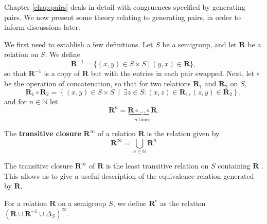 Chapter \ref{chap:pairs} deals in detail with congruences specified by
generating pairs.  We now present some theory relating to generating pairs, in
order to inform discussions later.

We first need to establish a few definitions.  Let $S$ be a semigroup, and let
$\mathbf{R}$ be a relation on $S$.  We define
$$\mathbf{R}^{-1} = \{(x,y) \in S \times S ~|~ (y,x) \in \mathbf{R}\},$$
so that $\mathbf{R}^{-1}$ is a copy of $\mathbf{R}$ but with the entries in each
pair swapped. 
Next, let $\circ$ be the operation of concatenation, so that for two relations
$\mathbf{R}_1$ and $\mathbf{R}_2$ on $S$,
$$\mathbf{R}_1 \circ \mathbf{R}_2 = \left\{(x,y) \in S \times S ~\middle|~
  \exists z \in S: (x,z) \in \mathbf{R}_1, (z,y) \in \mathbf{R}_2\right\},$$
and for $n \in \mathbb{N}$ let
$$\mathbf{R}^n = \underbrace{\mathbf{R} \circ \dots \circ \mathbf{R}}_{n~\text{times}}.$$

\begin{definition}
  \label{def:transitiveclosure}
  The \textbf{transitive closure} $\mathbf{R}^\infty$ of a relation $\mathbf{R}$
  is the relation given by
  $$\mathbf{R}^\infty=\bigcup_{n \in \mathbb{N}}\mathbf{R}^n$$
\end{definition}

The transitive closure $\mathbf{R}^\infty$ of $\mathbf{R}$ is the least
transitive relation on $S$ containing $\mathbf{R}$ \cite[Lemma
2.3]{mtorpey_msc}.  This allows us to give a useful description of the
equivalence relation generated by $\mathbf{R}$.

\begin{definition}
  \label{def:re}
  For a relation $\mathbf{R}$ on a semigroup $S$, we define $\mathbf{R}^e$ as
  the relation $\left(\mathbf{R} \cup \mathbf{R}^{-1} \cup \Delta_S\right)^\infty$.
\end{definition}

